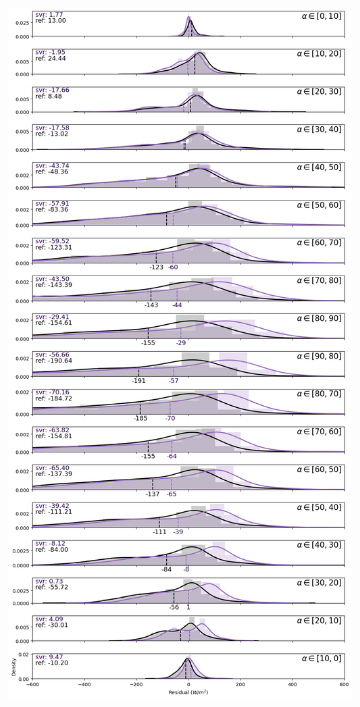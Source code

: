 \begin{figure}[htb!]
\begin{subfigure}{0.49\columnwidth}
    \end{subfigure}
    \begin{subfigure}{0.49\columnwidth}
        \includegraphics[width=\columnwidth, height=0.9\textheight]{figures/first_study/residual_errors_svr_site3_mae.png}
    \end{subfigure}
\end{figure}

